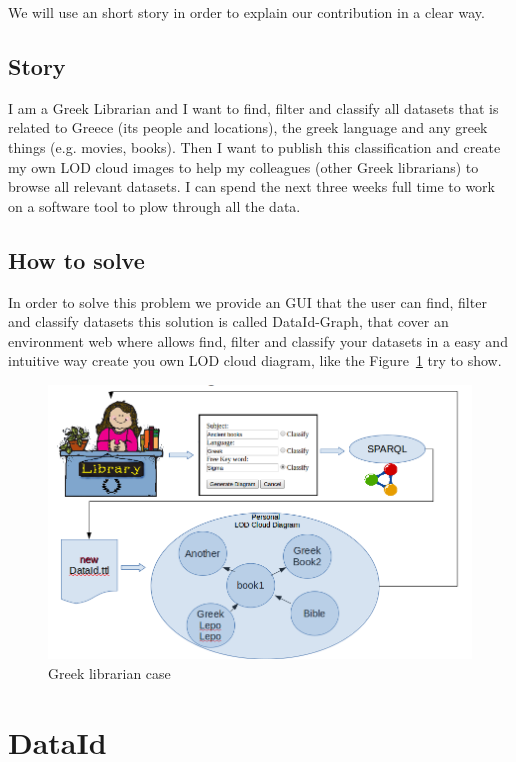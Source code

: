 \documentclass{iosart2c}
\begin{document}
We will use an short story in order to explain our contribution in a clear way.

\subsection{Story} 

I am a Greek Librarian and I want to find, filter and classify all datasets that is related to Greece (its people and locations), the greek language and any greek things (e.g. movies, books). Then I want to publish this classification and create my own LOD cloud images to help my colleagues (other Greek librarians) to browse all relevant datasets. I can spend the next three weeks full time to work on a software tool to plow through all the data.

\subsection{How to solve}
In order to solve this problem we provide an GUI that the user can find, filter and classify datasets this solution is called DataId-Graph, that cover an environment web where allows find, filter and classify your datasets in a easy and intuitive way create you own LOD cloud diagram, like the Figure~\ref{fig:greek} try to show.

\begin{figure}[tbp] 
  \centering
\includegraphics[width=\textwidth]{img/greeklib.png}
  \caption{Greek librarian case}
  \label{fig:greek}
\end{figure}

\section{DataId}
\end{document}
